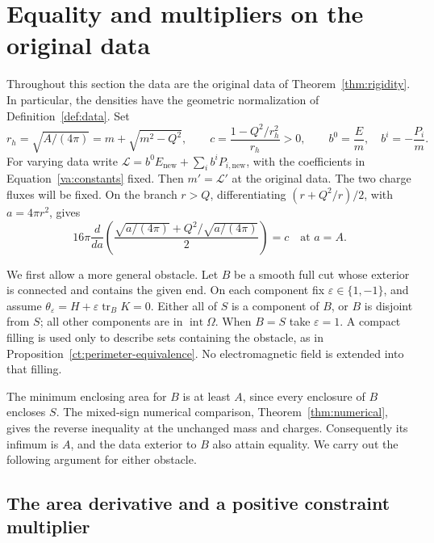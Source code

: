 \section{Equality and multipliers on the original data}
\label{va:section}

Throughout this section the data are the original data of
Theorem~\ref{thm:rigidity}.  In particular, the densities have the geometric
normalization of Definition~\ref{def:data}.  Set
\begin{equation}\label{va:constants}
 r_h=\sqrt{A/(4\pi)}=m+\sqrt{m^2-Q^2},\qquad
 c=\frac{1-Q^2/r_h^2}{r_h}>0,\qquad
 b^0=\frac E m,\quad b^i=-\frac{P_i}{m}.
\end{equation}
For varying data write
\(\mathcal L=b^0E_{\mathrm{new}}+\sum_i b^iP_{i,\mathrm{new}}\), with
the coefficients in Equation~\eqref{va:constants} fixed.  Then
\(m'=\mathcal L'\) at the original data.  The two charge fluxes will be
fixed.  On the branch \(r>Q\), differentiating
\((r+Q^2/r)/2\), with \(a=4\pi r^2\), gives
\begin{equation}\label{va:mass-area-derivative}
 16\pi\frac{d}{da}\left(\frac{\sqrt{a/(4\pi)}+
 Q^2/\sqrt{a/(4\pi)}}2\right)=c\quad\text{at }a=A.
\end{equation}

We first allow a more general obstacle.  Let \(B\) be a smooth full cut
whose exterior is connected and contains the given end.  On each component
fix \(\varepsilon\in\{1,-1\}\), and assume
\(\theta_\varepsilon=H+\varepsilon\operatorname{tr}_B K=0\).
Either all of \(S\) is a component of \(B\), or \(B\) is disjoint from
\(S\); all other components are in \(\operatorname{int}\Omega\).
When \(B=S\) take \(\varepsilon=1\).  A compact filling is used only to
describe sets containing the obstacle, as in
Proposition~\ref{ct:perimeter-equivalence}.  No electromagnetic field is extended
into that filling.

The minimum enclosing area for \(B\) is at least \(A\), since every
enclosure of \(B\) encloses \(S\).  The mixed-sign numerical comparison,
Theorem~\ref{thm:numerical}, gives the reverse inequality at the
unchanged mass and charges.  Consequently its infimum is \(A\), and the
data exterior to \(B\) also attain equality.  We carry out the following
argument for either obstacle.

\subsection{The area derivative and a positive constraint multiplier}


